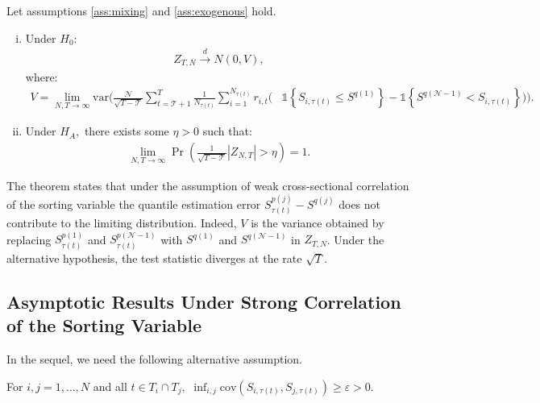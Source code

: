 \begin{theorem}
\label{th:observable} 

Let assumptions \ref{ass:mixing} and \ref{ass:exogenous} hold.

\begin{enumerate}[(i)]
\item Under $H_{0}$: \label{th:observable, i} 
\begin{align*}
    Z_{T,N}\overset{d}{\rightarrow }N(0,V), 
\end{align*}
where:
\begin{align*}
    V = \lim_{N,T\rightarrow \infty } \mathrm{var} \Bigg( \frac{\mathcal{N}}{\sqrt{T-\mathcal{T}}}\sum_{t=\mathcal{T}+1}^{T}\frac{1}{N_{\tau(t)}} \sum_{i=1}^{N_{\tau(t)}} r_{i,t} \Big( &\mathds{1}\left\{ S_{i,\tau(t) } \leq S^{q(1)}\right\} - \mathds{1}\left\{ S^{q(\mathcal{N} -1)} < S_{i,\tau(t) }\right\} \Big) \Bigg).
\end{align*}

\item Under $H_{A},$ there exists some $\eta >0$ such that: \label{th:observable, ii} 
\begin{align*}
    \lim_{N,T\rightarrow \infty }\Pr \left( \frac{1}{\sqrt{T-\mathcal{T}}} \left\vert Z_{N,T} \right\vert>\eta \right) =1. 
\end{align*}
\end{enumerate}
\end{theorem}

\noindent
The theorem states that under the assumption of weak cross-sectional correlation of the sorting variable the quantile estimation error $S_{\tau(t)}^{p(j)}-S^{q(j)}$ does not contribute to the limiting distribution. Indeed, $V$ is the variance obtained by replacing $S_{\tau(t)}^{p(1)}$ and $S_{\tau(t)}^{p(\mathcal{N}-1)}$ with $S^{q(1)}$ and $S^{q(\mathcal{N}-1)}$ in $Z_{T,N}$. Under the alternative hypothesis, the test statistic diverges at the rate $\sqrt{T}$. 

\subsection{Asymptotic Results Under Strong Correlation of the Sorting Variable}

In the sequel, we need the following alternative assumption. 

\begin{assumption}
\label{ass:strongdep} 

For $i,j=1, \ldots, N$ and all $t\in T_{i}\cap T_{j},$ $\inf_{i,j}\mathrm{cov}\left( S_{i,\tau(t)},S_{j,\tau(t)}\right) \geq \varepsilon >0$.
\end{assumption}


